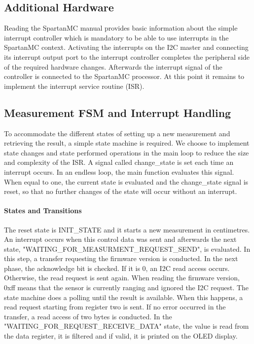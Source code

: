 		\subsection{Additional Hardware} %
		\label{sub:additional_hardware}
			Reading the SpartanMC manual provides basic information about the simple interrupt controller which is mandatory to be able to use interrupts in the SpartanMC context. Activating the interrupts on the I2C master and connecting its interrupt output port to the interrupt controller completes the peripheral side of the required hardware changes. Afterwards the interrupt signal of the controller is connected to the SpartanMC processor. At this point it remains to implement the interrupt service routine (ISR).

		\subsection{Measurement FSM and Interrupt Handling} %
		\label{sub:measurement_fsm_and_interrupt_handling}
			To accommodate the different states of setting up a new measurement and retrieving the result, a simple state machine is required. We choose to implement state changes and state performed operations in the main loop to reduce the size and complexity of the ISR.
			A signal called change\_state is set each time an interrupt occurs. In an endless loop, the main function evaluates this signal. When equal to one, the current state is evaluated and the change\_state signal is reset, so that no further changes of the state will occur without an interrupt.

			\paragraph{States and Transitions} %
			\label{par:states_and_transitions}
				The reset state is INIT\_STATE and it starts a new measurement in centimetres. An interrupt occurs when this control data was sent and afterwards the next state, "WAITING\_FOR\_MEASURMENT\_REQUEST\_SEND", is evaluated. In this step, a transfer requesting the firmware version is conducted. In the next phase, the acknowledge bit is checked. If it is 0, an I2C read access occurs. Otherwise, the read request is sent again. When reading the firmware version, 0xff means that the sensor is currently ranging and ignored the I2C request. The state machine does a polling until the result is available. When this happens, a read request starting from register two is sent. If no error occurred in the transfer, a read access of two bytes is conducted. In the "WAITING\_FOR\_REQUEST\_RECEIVE\_DATA" state, the value is read from the data register, it is filtered and if valid, it is printed on the OLED display.
			
